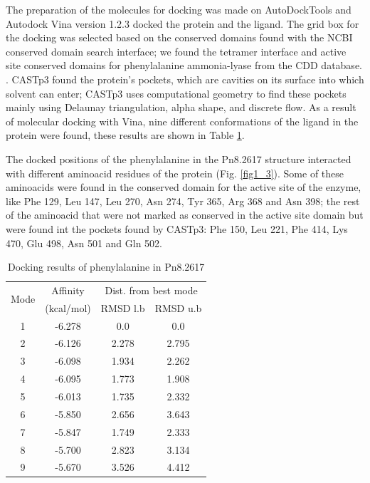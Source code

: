 \documentclass[12pt]{article}
\begin{document}
	The preparation of the molecules for docking was made on AutoDockTools and Autodock Vina version 1.2.3 docked the protein and the ligand. \cite{adt,vina,vina_2} The grid box for the docking was selected based on the conserved domains found with the NCBI conserved domain search interface; we found the tetramer interface and active site conserved domains for phenylalanine ammonia-lyase from the CDD database. \cite{cdd,cdd_2}.  CASTp3 found the protein's pockets, which are cavities on its surface into which solvent can enter; CASTp3 uses computational geometry to find these pockets mainly using Delaunay triangulation, alpha shape, and discrete flow. \cite{castp} As a result of molecular docking with Vina, nine different conformations of the ligand in the protein were found, these results are shown in Table \ref{table1}.
	
	The docked positions of the phenylalanine in the Pn8.2617 structure interacted with different aminoacid residues of the protein (Fig. \ref{fig1_3}). Some of these aminoacids were found in the conserved domain for the active site of the enzyme, like Phe 129, Leu 147, Leu 270, Asn 274, Tyr 365, Arg 368 and Asn 398; the rest of the aminoacid that were not marked as conserved in the active site domain but were found int the pockets found by CASTp3: Phe 150, Leu 221, Phe 414, Lys 470, Glu 498, Asn 501 and Gln 502.
	
	\begin{table}[h]
		\centering
		\caption{Docking results of phenylalanine in Pn8.2617}
		\label{table1}
		\begin{tabular}{cccc}
			\toprule
			\multirow{2}{*}{Mode} & Affinity & \multicolumn{2}{c}{Dist. from best mode}\\
			&  (kcal/mol) & RMSD l.b & RMSD u.b\\
			\midrule
			1 & -6.278   &     0.0   &     0.0\\
			2 & -6.126   &   2.278   &   2.795\\
			3 & -6.098   &   1.934   &   2.262\\
			4 & -6.095   &   1.773   &   1.908\\
			5 & -6.013   &   1.735   &   2.332\\
			6 & -5.850   &   2.656   &   3.643\\
			7 & -5.847   &   1.749   &   2.333\\
			8 & -5.700   &   2.823   &   3.134\\
			9 & -5.670   &   3.526   &   4.412\\
			\bottomrule
			
		\end{tabular}
	\end{table}
\end{document}
